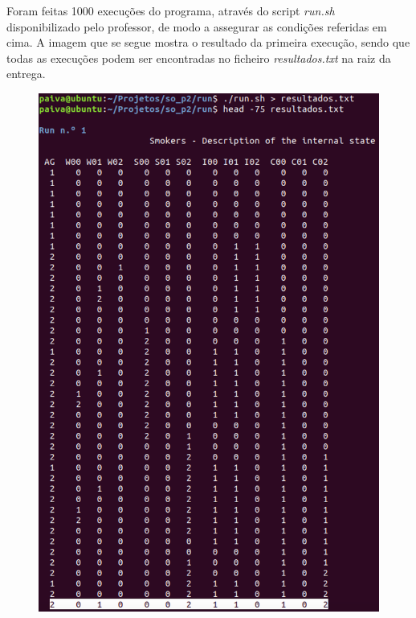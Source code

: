 \documentclass[10pt,portuguese]{article}
\begin{document}
\par Foram feitas 1000 execuções do programa, através do script \textit{run.sh} disponibilizado pelo professor, de modo a assegurar as condições referidas em cima. A imagem que se segue mostra o resultado da primeira execução, sendo que todas as execuções podem ser encontradas no ficheiro \textit{resultados.txt} na raiz da entrega.

\begin{figure}[!h]
    \centering
    \includegraphics[scale=0.5]{images/resultados/res1.png}
\end{figure}
\clearpage
\end{document}

